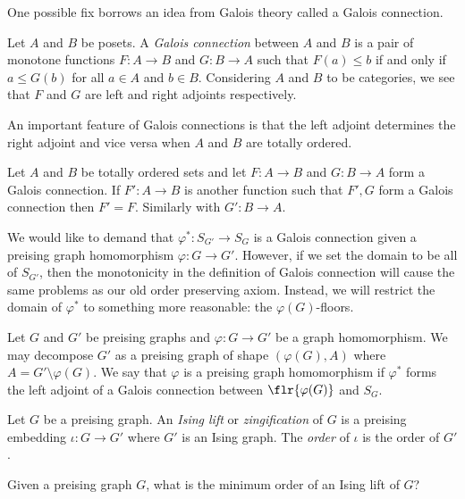 One possible fix borrows an idea from Galois theory called a Galois connection.
\begin{defn}\label{defn:galois-connection}
	Let $A$ and $B$ be posets. A \emph{Galois connection} between $A$ and $B$ is a pair of monotone functions $F:A\to B$ and $G:B\to A$ such that $F(a) \leq b$ if and only if $a \leq G(b)$ for all $a \in A$ and $b \in B$. Considering $A$ and $B$ to be categories, we see that $F$ and $G$ are left and right adjoints respectively.
\end{defn}
An important feature of Galois connections is that the left adjoint determines the right adjoint and vice versa when $A$ and $B$ are totally ordered.
\begin{lem}\label{lem:uniqueness-of-galois-connection}
	Let $A$ and $B$ be totally ordered sets and let $F:A\to B$ and $G:B\to A$ form a Galois connection. If $F':A\to B$ is another function such that $F',G$ form a Galois connection then $F' = F$. Similarly with $G':B\to A$.
\end{lem}

We would like to demand that $\varphi^*:S_{G'}\to S_G$ is a Galois connection given a preising graph homomorphism $\varphi:G\to G'$. However, if we set the domain to be all of $S_{G'}$, then the monotonicity in the definition of Galois connection will cause the same problems as our old order preserving axiom. Instead, we will restrict the domain of $\varphi^*$ to something more reasonable: the $\varphi(G)$-floors.

\begin{defn}\label{defn:floor-preserving-map}
	Let $G$ and $G'$ be preising graphs and $\varphi:G\to G'$ be a graph homomorphism. We may decompose $G'$ as a preising graph of shape $(\varphi(G), A)$ where $A = G'\setminus \varphi(G)$. We say that $\varphi$ is a preising graph homomorphism if $\varphi^*$ forms the left adjoint of a Galois connection between $\flr{\varphi(G)}$ and $S_G$.
\end{defn}
\begin{defn}\label{defn:zingification}
	Let $G$ be a preising graph. An \emph{Ising lift} or \emph{zingification} of $G$ is a preising embedding $\iota:G\to G'$ where $G'$ is an Ising graph. The \emph{order} of $\iota$ is the order of $G'$.
\end{defn}
\begin{question}\label{q:zingification}
	Given a preising graph $G$, what is the minimum order of an Ising lift of $G$?
\end{question}

